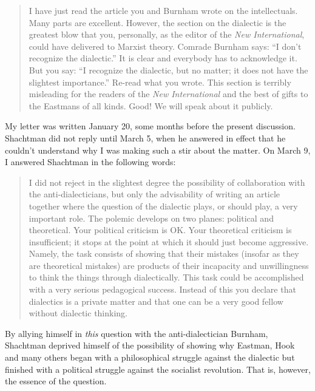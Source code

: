 \begin{quote}
I have just read the article you and Burnham wrote on the intellectuals. Many parts are excellent. However, the section on the dialectic is the greatest blow that you, personally, as the editor of the \emph{New International}, could have delivered to Marxist theory. Comrade Burnham says: ``I don’t recognize the dialectic.'' It is clear and everybody has to acknowledge it. But you say: ``I recognize the dialectic, but no matter; it does not have the slightest importance.'' Re-read what you wrote. This section is terribly misleading for the readers of the \emph{New International} and the best of gifts to the Eastmans of all kinds. Good! We will speak about it publicly.\nowidow
\end{quote}

My letter was written January 20, some months before the present discussion. Shachtman did not reply until March 5, when he answered in effect that he couldn’t understand why I was making such a stir about the matter. On March 9, I answered Shachtman in the following words:

\begin{quote}
  I did not reject in the slightest degree the possibility of collaboration with the anti-dialecticians, but only the advisability of writing an article together where the question of the dialectic plays, or should play, a very important role. The polemic develops on two planes: political and theoretical. Your political criticism is OK. Your theoretical criticism is insufficient; it stops at the point at which it should just become aggressive. Namely, the task consists of showing that their mistakes (insofar as they are theoretical mistakes) are products of their incapacity and unwillingness to think the things through dialectically. This task could be accomplished with a very serious pedagogical success. Instead of this you declare that dialectics is a private matter and that one can be a very good fellow without dialectic thinking.
\end{quote}

By allying himself in \emph{this} question with the anti-dialectician Burnham, Shachtman deprived himself of the possibility of showing why Eastman, Hook and many others began with a philosophical struggle against the dialectic but finished with a political struggle against the socialist revolution. That is, however, the essence of the question.

